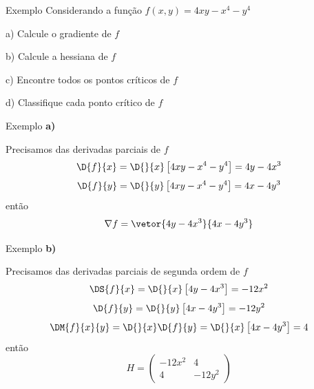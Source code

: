 \addtocounter{exemplo}{1}
\begin{frame}{Exemplo \theexemplo}
  Considerando a função
  \(
    f(x, y) = 4xy -x^4 -y^4
  \)

  a) Calcule o gradiente de $f$

  b) Calcule a hessiana de $f$

  c) Encontre todos os pontos críticos de $f$

  d) Classifique cada ponto crítico de $f$
\end{frame}

\begin{frame}{Exemplo \theexemplo}
  \noindent\textbf{a)}

  Precisamos das derivadas parciais de $f$
  \[
  \D{f}{x}
  = \D{}{x}\left[4xy -x^4 -y^4\right]
  = 4y - 4x^3
  \]
  \[
  \D{f}{y}
  = \D{}{y}\left[4xy -x^4 -y^4\right]
  = 4x -4y^3
  \]
  então
  \[
  \nabla f = \vetor{4y - 4x^3}{4x -4y^3}
  \]
\end{frame}

\begin{frame}{Exemplo \theexemplo}
  \noindent\textbf{b)}

  Precisamos das derivadas parciais de segunda ordem de $f$
  \[
  \DS{f}{x}
  = \D{}{x}\left[4y - 4x^3\right]
  = -12x^2
  \]
  \[
  \D{f}{y}
  = \D{}{y}\left[4x -4y^3\right]
  = -12y^2
  \]
  \[
  \DM{f}{x}{y}
  = \D{}{x}\D{f}{y}
  = \D{}{x}\left[4x -4y^3\right]
  = 4
  \]
  então
  \[
  H = \left(\begin{array}{cc}
    -12x^2 & 4 \\
    4 & -12y^2
  \end{array}\right)
  \]
\end{frame}

